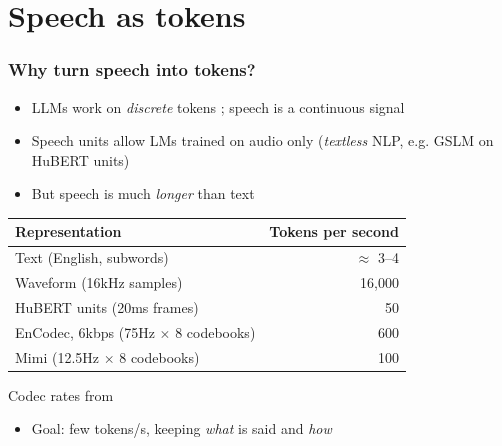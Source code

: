 \documentclass[table]{beamer}
\begin{document}

\section{Speech as tokens}

\frame{\tableofcontents[currentsection]}

\begin{frame}
\frametitle{Why turn speech into tokens?}
\begin{itemize}
	\item LLMs work on \textit{discrete} tokens ; speech is a continuous signal
	\item Speech units allow LMs trained on audio only (\textit{textless} NLP, e.g. GSLM \citep{lakhotia2021gslm} on HuBERT units)
	\item But speech is much \textit{longer} than text
\end{itemize}
\begin{center}
\renewcommand{\arraystretch}{1.2}
\small
\begin{tabular}{lr}
	\textbf{Representation} & \textbf{Tokens per second} \\
	\hline
	Text (English, subwords) & $\approx$ 3--4 \\
	Waveform (16kHz samples) & 16,000 \\
	HuBERT units (20ms frames) & 50 \\
	EnCodec, 6kbps (75Hz $\times$ 8 codebooks) & 600 \\
	Mimi (12.5Hz $\times$ 8 codebooks) & 100 \\
\end{tabular}

{\footnotesize\color{softgrey} Codec rates from \citep{defossez2022encodec,moshi2024}}
\end{center}
\begin{itemize}
	\item Goal: few tokens/s, keeping \textit{what} is said and \textit{how}
\end{itemize}
\end{frame}
\end{document}
